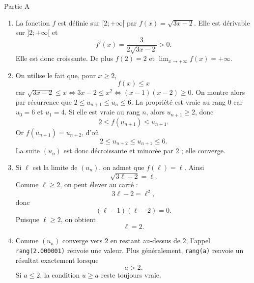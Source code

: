 \documentclass[11pt,a4paper]{article}
\begin{document}
\begin{correctionbox}{Partie A}
\begin{enumerate}
\item La fonction $f$ est définie sur $[2;+\infty[$ par $f(x)=\sqrt{3x-2}$. Elle est dérivable sur $]2;+\infty[$ et
\[
f'(x)=\dfrac{3}{2\sqrt{3x-2}}>0.
\]
Elle est donc croissante. De plus $f(2)=2$ et $\lim_{x\to+\infty}f(x)=+\infty$.

\begin{center}
\end{center}

\item On utilise le fait que, pour $x\geqslant2$,
\[
f(x)\leqslant x
\]
car $\sqrt{3x-2}\leqslant x \Longleftrightarrow 3x-2\leqslant x^2 \Longleftrightarrow (x-1)(x-2)\geqslant0$.
On montre alors par récurrence que $2\leqslant u_{n+1}\leqslant u_n\leqslant6$. La propriété est vraie au rang $0$ car $u_0=6$ et $u_1=4$.
Si elle est vraie au rang $n$, alors $u_{n+1}\geqslant2$, donc
\[
2\leqslant f(u_{n+1})\leqslant u_{n+1}.
\]
Or $f(u_{n+1})=u_{n+2}$, d'où
\[
2\leqslant u_{n+2}\leqslant u_{n+1}\leqslant6.
\]
La suite $(u_n)$ est donc décroissante et minorée par $2$ ; elle converge.

\item Si $\ell$ est la limite de $(u_n)$, on admet que $f(\ell)=\ell$. Ainsi
\[
\sqrt{3\ell-2}=\ell.
\]
Comme $\ell\geqslant2$, on peut élever au carré :
\[
3\ell-2=\ell^2,
\]
donc
\[
(\ell-1)(\ell-2)=0.
\]
Puisque $\ell\geqslant2$, on obtient
\[
\ell=2.
\]

\item Comme $(u_n)$ converge vers $2$ en restant au-dessus de $2$, l'appel \texttt{rang(2.000001)} renvoie une valeur. Plus généralement, \texttt{rang(a)} renvoie un résultat exactement lorsque
\[
a>2.
\]
Si $a\leqslant2$, la condition $u\geqslant a$ reste toujours vraie.
\end{enumerate}
\end{correctionbox}
\end{document}
